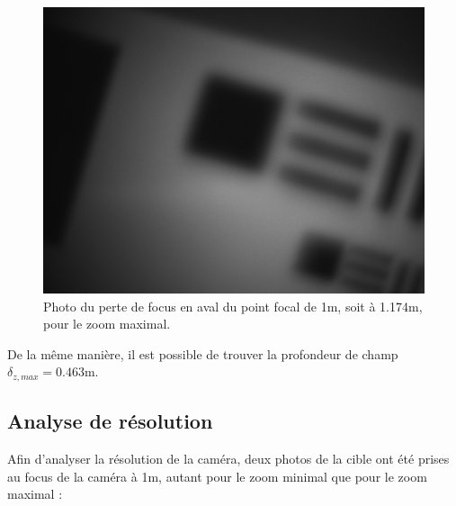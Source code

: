 \documentclass[11pt,letterpaper]{article}
\begin{document}
\begin{figure}[H]
  \centering
  \includegraphics[scale=0.3]{prof_1.174_max.png}
  \caption{Photo du perte de focus en aval du point focal de 1m, soit à 1.174m,
  pour le zoom maximal.}
  \label{prof_arr_max}
\end{figure}

De la même manière, il est possible de trouver la profondeur de champ 
$\delta_{z,max}= 0.463$m.


\subsection{Analyse de résolution}
 
Afin d'analyser la résolution de la caméra, deux photos de la cible ont été prises
au focus de la caméra à 1m, autant pour le zoom minimal que pour le zoom maximal : 
\end{document}

